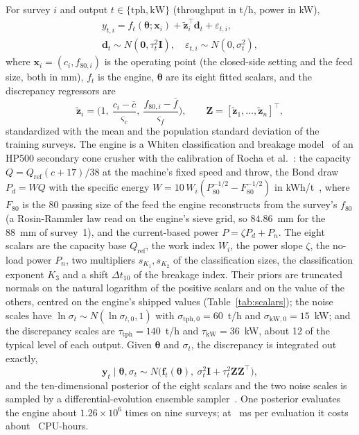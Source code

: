 For survey $i$ and output $t\in\{\mathrm{tph},\mathrm{kW}\}$ (throughput in t/h, power in kW),
\begin{equation}
\begin{gathered}
y_{t,i}=f_t(\boldsymbol\theta;\mathbf x_i)+\tilde{\mathbf z}_i^{\top}\mathbf d_t+\varepsilon_{t,i},\\
\mathbf d_t\sim N(\mathbf 0,\tau_t^2\mathbf I),\quad \varepsilon_{t,i}\sim N(0,\sigma_t^2),
\end{gathered}
\label{eq:model}
\end{equation}
where $\mathbf x_i=(c_i,f_{80,i})$ is the operating point (the closed-side setting and the feed size, both in mm), $f_t$ is the
engine, $\boldsymbol\theta$ are its eight fitted scalars, and the discrepancy regressors are
\begin{equation}
\tilde{\mathbf z}_i=\Big(1,\ \frac{c_i-\bar c}{\varsigma_c},\ \frac{f_{80,i}-\bar f}{\varsigma_f}\Big),\qquad \mathbf Z=[\tilde{\mathbf z}_1,\dots,\tilde{\mathbf z}_n]^{\top},
\label{eq:design}
\end{equation}
standardized with the mean and the population standard deviation of the training surveys. The engine is a Whiten
classification and breakage model~\cite{whiten,napier} of an HP500 secondary cone crusher with the calibration of Rocha et
al.~\cite{rocha}: the capacity $Q=Q_{\mathrm{ref}}(c+17)/38$ at the machine's fixed speed and throw, the Bond draw $P_d=W Q$
with the specific energy $W=10\,W_i(P_{80}^{-1/2}-F_{80}^{-1/2})$ in kWh/t~\cite{bond}, where $F_{80}$ is the 80\pct{}
passing size of the feed the engine reconstructs from the survey's $f_{80}$ (a Rosin-Rammler law read on the engine's sieve
grid, so $84.86$~mm for the 88~mm of survey~1), and the current-based power
$P=\zeta P_d+P_n$. The eight scalars are the capacity base $Q_{\mathrm{ref}}$, the work index $W_i$, the power slope $\zeta$,
the no-load power $P_n$, two multipliers $s_{K_1},s_{K_2}$ of the classification sizes, the classification exponent $K_3$ and a
shift $\Delta t_{10}$ of the breakage index. Their priors are truncated normals on the natural logarithm of the positive
scalars and on the value of the others, centred on the engine's shipped values (Table~\ref{tab:scalars}); the noise scales
have $\ln\sigma_t\sim N(\ln\sigma_{t,0},1)$ with $\sigma_{\mathrm{tph},0}=60$~t/h and $\sigma_{\mathrm{kW},0}=15$~kW; and the
discrepancy scales are $\tau_{\mathrm{tph}}=140$~t/h and $\tau_{\mathrm{kW}}=36$~kW, about 12\pct{} of the typical level of
each output. Given $\boldsymbol\theta$ and $\sigma_t$, the discrepancy is integrated out exactly,
\begin{equation}
\mathbf y_t\mid\boldsymbol\theta,\sigma_t\sim N\big(\mathbf f_t(\boldsymbol\theta),\ \sigma_t^2\mathbf I+\tau_t^2\mathbf Z\mathbf Z^{\top}\big),
\label{eq:marginal}
\end{equation}
and the ten-dimensional posterior of the eight scalars and the two noise scales is sampled by a differential-evolution
ensemble sampler~\cite{emcee,tb06,tbv08}. One posterior evaluates the engine about $1.26\times10^6$ times on nine surveys; at
\engineMs~ms per evaluation it costs about \cbCpuHours~CPU-hours.

